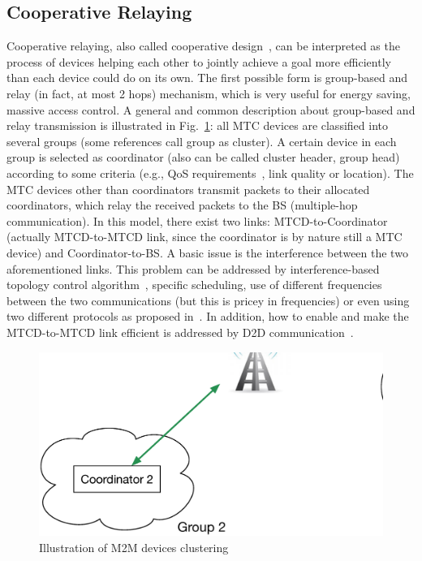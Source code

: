 \subsection{Cooperative Relaying}%
Cooperative relaying, also called cooperative design~\cite{bartoli2011low}, can be interpreted as the process of devices helping each other to jointly achieve a goal more efficiently than each device could do on its own. The first possible form is group-based and relay (in fact, at most 2 hops) mechanism, which is very useful for energy saving, massive access control. A general and common description about group-based and relay transmission is illustrated in Fig.~\ref{fig:Illustration of M2M devices clustering}: all MTC devices are classified into several groups (some references call group as cluster). A certain device in each group is selected as coordinator (also can be called cluster header, group head) according to some criteria (e.g., QoS requirements~\cite{LienCL11}, link quality or location). The MTC devices other than coordinators transmit packets to their allocated coordinators, which relay the received packets to the BS (multiple-hop communication). In this model, there exist two links: MTCD-to-Coordinator (actually MTCD-to-MTCD link, since the coordinator is by nature still a MTC device) and Coordinator-to-BS. 
A basic issue is the interference between the two aforementioned links. This problem can be addressed by interference-based topology control algorithm~\cite{zhang2015interference}, specific scheduling, use of different frequencies between the two communications (but this is pricey in frequencies) or even using two different protocols as proposed in~\cite{YuanHo12}. In addition, how to enable and make the MTCD-to-MTCD link efficient is addressed by D2D communication~\cite{niu2015survey}\cite{niu2015exploiting}.
\begin{figure}[!t]
	\centering
	\includegraphics[width=0.8\linewidth,height=6cm]{Chapter2/Figures/Device_Clustering}
	\caption{Illustration of M2M devices clustering}
	\label{fig:Illustration of M2M devices clustering}
\end{figure}

